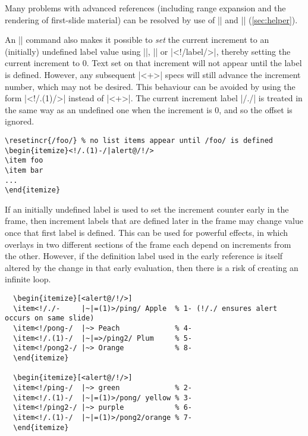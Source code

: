 \documentclass[a4paper]{ltxdoc}
\begin{document}
Many problems with advanced references (including range expansion and the
rendering of first-slide material) can be resolved by use of |\framescanonly|
and |\againframe| (\cref{sec:helper}).

An |\allowundefinedincrlabels| command also makes it possible to \emph{set} the
current increment to an (initially) undefined label value using |\resetincr|,
|\fromincr| or |<!/label/>|, thereby setting the current increment to 0.  Text
set on that increment will not appear until the label is defined.  However, any
subsequent |<+>| specs will still advance the increment number, which may not be
desired.  This behaviour can be avoided by using the form |<!/.(1)/>| instead of
|<+>|.  The current increment label |/./| is treated in the same way as an
undefined one when the increment is 0, and so the offset is ignored.
\example
\begin{verbatim}
\resetincr{/foo/} % no list items appear until /foo/ is defined
\begin{itemize}<!/.(1)-/|alert@/!/>
\item foo
\item bar
...
\end{itemize}
\end{verbatim}
If an initially undefined label is used to set the increment counter early in
the frame, then increment labels that are defined later in the frame may change
value once that first label is defined.  This can be used for powerful effects,
in which overlays in two different sections of the frame each depend on
increments from the other.  However, if the definition label used in the early
reference is itself altered by the change in that early evaluation, then there
is a risk of creating an infinite loop.
\example
\begin{verbatim}
  \begin{itemize}[<alert@/!/>]
  \item<!/./-     |~|=(1)>/ping/ Apple  % 1- (!/./ ensures alert occurs on same slide)
  \item<!/pong-/  |~> Peach             % 4-
  \item<!/.(1)-/  |~|=>/ping2/ Plum     % 5-
  \item<!/pong2-/ |~> Orange            % 8-
  \end{itemize}
  
  \begin{itemize}[<alert@/!/>]
  \item<!/ping-/  |~> green             % 2-
  \item<!/.(1)-/  |~|=(1)>/pong/ yellow % 3-
  \item<!/ping2-/ |~> purple            % 6-
  \item<!/.(1)-/  |~|=(1)>/pong2/orange % 7-
  \end{itemize}
\end{verbatim}
\end{document}
